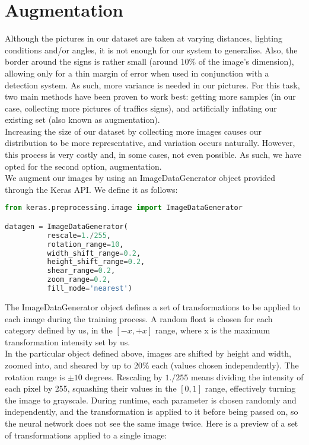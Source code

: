 \section{Augmentation}
Although the pictures in our dataset are taken at varying distances, lighting conditions and/or angles, it is not enough for our system to generalise. Also, the border around the signs is rather small (around 10\% of the image's dimension), allowing only for a thin margin of error when used in conjunction with a detection system. As such, more variance is needed in our pictures. For this task, two main methods have been proven to work best: getting more samples (in our case, collecting more pictures of traffics signs), and artificially inflating our existing set (also known as augmentation).\\
Increasing the size of our dataset by collecting more images causes our distribution to be more representative, and variation occurs naturally. However, this process is very costly and, in some cases, not even possible. As such, we have opted for the second option, augmentation.\\
We augment our images by using an ImageDataGenerator object provided through the Keras API. We define it as follows:
\begin{lstlisting}[language=Python]
from keras.preprocessing.image import ImageDataGenerator

datagen = ImageDataGenerator(
          rescale=1./255,
          rotation_range=10,
          width_shift_range=0.2,
          height_shift_range=0.2,
          shear_range=0.2,
          zoom_range=0.2,
          fill_mode='nearest')
\end{lstlisting}
The ImageDataGenerator object defines a set of transformations to be applied to each image during the training process. A random float is chosen for each category defined by us, in the $[-x,+x]$ range, where x is the maximum transformation intensity set by us.\\
In the particular object defined above, images are shifted by height and width, zoomed into, and sheared by up to 20\% each (values chosen independently). The rotation range is $\pm{10}$ degrees. Rescaling by $1./255$ means dividing the intensity of each pixel by 255, squashing their values in the $[0,1]$ range, effectively turning the image to grayscale. During runtime, each parameter is chosen randomly and independently, and the transformation is applied to it before being passed on, so the neural network does not see the same image twice. Here is a preview of a set of transformations applied to a single image:

